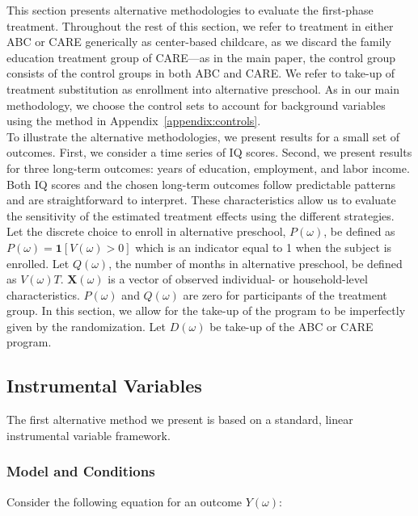 \begin{appendices}
\noindent This section presents alternative methodologies to evaluate the first-phase treatment. Throughout the rest of this section, we refer to treatment in either ABC or CARE generically as center-based childcare, as we discard the family education treatment group of CARE---as in the main paper, the control group consists of the control groups in both ABC and CARE. We refer to take-up of treatment substitution as enrollment into alternative preschool. As in our main methodology, we choose the control sets to account for background variables using the method in Appendix~\ref{appendix:controls}.\\

\noindent To illustrate the alternative methodologies, we present results for a small set of outcomes. First, we consider a time series of IQ scores. Second, we present results for three long-term outcomes: years of education, employment, and labor income. Both IQ scores and the chosen long-term outcomes follow predictable patterns and are straightforward to interpret. These characteristics allow us to evaluate the sensitivity of the estimated treatment effects using the different strategies.\\

\noindent Let the discrete choice to enroll in alternative preschool, $P(\omega)$, be defined as $P(\omega)=\mathbf{1}\left[V(\omega)>0\right]$ which is an indicator equal to 1 when the subject is enrolled. Let $Q(\omega)$, the number of months in alternative preschool, be defined as $V(\omega)T$. $\mathbf{X}(\omega)$ is a vector of observed individual- or household-level characteristics. $P(\omega)$ and $Q(\omega)$ are zero for participants of the treatment group. In this section, we allow for the take-up of the program to be imperfectly given by the randomization. Let $D(\omega)$ be take-up of the ABC or CARE program.

\subsection{Instrumental Variables}

\noindent The first alternative method we present is based on a standard, linear instrumental variable framework.

\subsubsection{Model and Conditions}

\noindent Consider the following equation for an outcome $Y(\omega)$:



\end{appendices}
